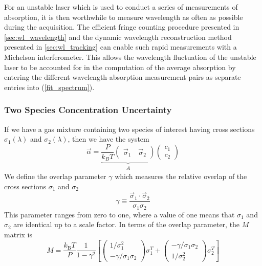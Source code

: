 \documentclass[12pt]{report}
\begin{document}
	For an unstable laser which is used to conduct a series of measurements of absorption, it is then worthwhile to measure wavelength as often as possible during the acquisition. The efficient fringe counting procedure presented in \ref{sec:wl_wavelength} and the dynamic wavelength reconstruction method presented in \ref{sec:wl_tracking} can enable such rapid measurements with a Michelson interferometer. This allows the wavelength fluctuation of the unstable laser to be accounted for in the computation of the average absorption by entering the different wavelength-absorption measurement pairs as separate entries into (\ref{fit_spectrum}).
	
	\subsubsection{Two Species Concentration Uncertainty}
	If we have a gas mixture containing two species of interest having cross sections $\sigma_1(\lambda)$ and $\sigma_2(\lambda)$, then we have the system
	\begin{equation*}
		\vec{\alpha} =
		\underbrace{
			\frac{P}{k_B T}
			\begin{pmatrix}
				\vec{\sigma}_1 \quad \vec{\sigma}_2
			\end{pmatrix}
		}_{\begin{matrix}A\end{matrix}}
		\begin{pmatrix}
			c_1 \\
			c_2
		\end{pmatrix}
	\end{equation*}
	We define the overlap parameter $\gamma$ which measures the relative overlap of the cross sections $\sigma_1$ and $\sigma_2$
	\begin{equation}
		\gamma \equiv \frac{\vec\sigma_1\cdot\vec\sigma_2}{\sigma_1\sigma_2}
	\end{equation}
	This parameter ranges from zero to one, where a value of one means that $\sigma_1$ and $\sigma_2$ are identical up to a scale factor. In terms of the overlap parameter, the $M$ matrix is
	\begin{equation}
		M = \frac{k_\mathrm{B} T}{P} \frac{1}{1 - \gamma^2}
		\left[
		\begin{pmatrix} 1/\sigma_1^2 \\ -\gamma/\sigma_1\sigma_2 \end{pmatrix} \sigma_1^T +
		\begin{pmatrix} -\gamma/\sigma_1\sigma_2 \\ 1/\sigma_2^2 \end{pmatrix} \sigma_2^T
		\right]
	\end{equation}
\end{document}
